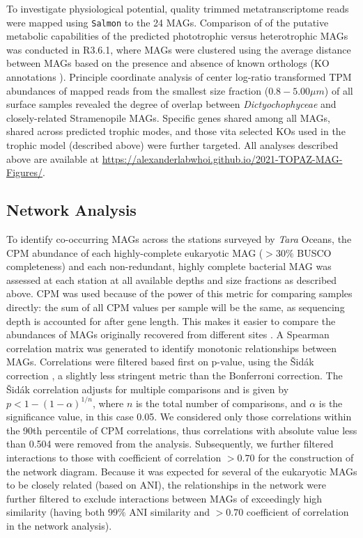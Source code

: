 \documentclass[12pt]{article}
\numberwithin{equation}{section}
\begin{document}
To investigate physiological potential, quality trimmed metatranscriptome reads were mapped using \texttt{Salmon} \cite{Patro2017Salmon} to the 24 MAGs. Comparison of of the putative metabolic capabilities of the predicted phototrophic versus heterotrophic MAGs was conducted in R3.6.1, where MAGs were clustered using the average distance between MAGs based on the presence and absence of known orthologs (KO annotations \citep{Kanehisa_2019}). Principle coordinate analysis of center log-ratio transformed TPM abundances of mapped reads from the smallest size fraction ($0.8 - 5.00 \mu m$) of all surface samples revealed the degree of overlap between \emph{Dictyochophyceae} and closely-related Stramenopile MAGs. Specific genes shared among all MAGs, shared across predicted trophic modes, and those vita selected KOs used in the trophic model (described above) were further targeted. All analyses described above are available at \url{ https://alexanderlabwhoi.github.io/2021-TOPAZ-MAG-Figures/}. 

\subsection*{Network Analysis} 

To identify co-occurring MAGs across the stations surveyed by \textit{Tara} Oceans, the CPM abundance of each highly-complete eukaryotic MAG ($>30\%$ BUSCO completeness) and each non-redundant, highly complete bacterial MAG was assessed at each station at all available depths and size fractions as described above. CPM was used because of the power of this metric for comparing samples directly: the sum of all CPM values per sample will be the same, as sequencing depth is accounted for after gene length. This makes it easier to compare the abundances of MAGs originally recovered from different sites \citep{Gradoville_2017}. A Spearman correlation matrix was generated to identify monotonic relationships between MAGs. Correlations were filtered based first on p-value, using the Šidák correction \citep{Sidak_1967}, a slightly less stringent metric than the Bonferroni correction. The Šidák correlation adjusts for multiple comparisons and is given by $p < 1-(1-\alpha)^{1/n}$, where $n$ is the total number of comparisons, and $\alpha$ is the significance value, in this case 0.05. We considered only those correlations within the 90th percentile of CPM correlations, thus correlations with absolute value less than 0.504 were removed from the analysis. Subsequently, we further filtered interactions to those with coefficient of correlation $>0.70$ for the construction of the network diagram. Because it was expected for several of the eukaryotic MAGs to be closely related (based on ANI), the relationships in the network were further filtered to exclude interactions between MAGs of exceedingly high similarity (having both $99\%$ ANI similarity and $>0.70$ coefficient of correlation in the network analysis). 
\end{document}
